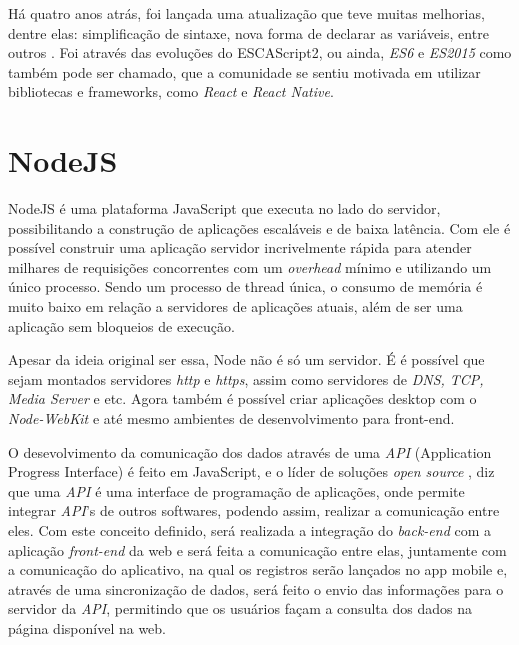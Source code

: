 Há quatro anos atrás, foi lançada uma atualização que teve muitas melhorias, dentre elas: simplificação de sintaxe, nova forma de declarar as variáveis, entre outros \cite{ecma}.
Foi através das evoluções do ESCAScript2, ou ainda, \textit{ES6} e \textit{ES2015} como também pode ser chamado, que a comunidade se sentiu motivada em utilizar bibliotecas e frameworks, como \textit{React} e \textit{React Native}. 


\section{NodeJS}
NodeJS é uma plataforma JavaScript que executa no lado do servidor, possibilitando a construção de aplicações escaláveis e de baixa latência. Com ele é possível construir uma aplicação servidor incrivelmente rápida para atender milhares de requisições concorrentes com um \textit{overhead} mínimo e utilizando um único processo. Sendo um processo de thread única, o consumo de memória é muito baixo em relação a servidores de aplicações atuais, além de ser uma aplicação sem bloqueios de execução. \cite{node}

Apesar da ideia original ser essa, Node não é só um servidor. É é possível que sejam montados servidores \textit{http} e  \textit{https}, assim como servidores de  \textit{DNS, TCP, Media Server} e etc. Agora também é possível criar aplicações desktop com o  \textit{Node-WebKit} e até mesmo ambientes de desenvolvimento para front-end. \cite{node1}



O desevolvimento da comunicação dos dados através de uma \textit{API} (Application Progress Interface) é feito em JavaScript,  e o líder de soluções \textit{open source} , diz que uma \textit{API} é uma interface de programação de aplicações, onde permite integrar \textit{API}'s de outros softwares, podendo assim, realizar a comunicação entre eles. Com este conceito definido, será realizada a integração do \textit{back-end} com a aplicação \textit{front-end} da web e será feita a comunicação entre elas, juntamente com a comunicação do aplicativo, na qual os registros serão lançados no app mobile e, através de uma sincronização de dados, será feito o envio das informações para o servidor da \textit{API}, permitindo que os usuários façam a consulta dos dados na página disponível na web.

